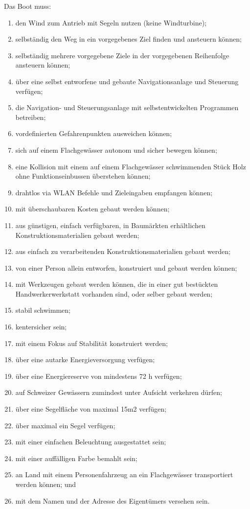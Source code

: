 Das Boot muss: 
\begin{enumerate}
    \item den Wind zum Antrieb mit Segeln nutzen (keine Windturbine);
    \item selbständig den Weg in ein vorgegebenes  Ziel finden und ansteuern können;
    \item selbständig mehrere vorgegebene Ziele in der vorgegebenen Reihenfolge ansteuern können;
    \item über eine selbst entworfene und gebaute Navigationsanlage und Steuerung verfügen;
    \item die Navigation- und Steuerungsanlage mit selbstentwickelten Programmen betreiben; 
    \item vordefinierten Gefahrenpunkten ausweichen können;
    \item sich auf einem Flachgewässer autonom und sicher bewegen können;
    \item eine Kollision mit einem auf einem Flachgewässer schwimmenden Stück Holz ohne Funktionseinbussen überstehen können;
    \item drahtlos via WLAN Befehle und Zieleingaben empfangen können;
    \item mit überschaubaren Kosten gebaut werden können;
    \item aus günstigen, einfach verfügbaren, in Baumärkten erhältlichen Konstruktionsmaterialien gebaut werden;
    \item aus einfach zu verarbeitenden Konstruktionsmaterialien gebaut werden;
    \item von einer Person allein entworfen, konstruiert und gebaut werden können;
    \item mit Werkzeugen gebaut werden können, die in einer gut bestückten Handwerkerwerkstatt vorhanden sind, oder selber gebaut werden; 
    \item stabil schwimmen;
    \item kentersicher sein;
    \item mit einem Fokus auf Stabilität konstruiert werden;
    \item über eine autarke Energieversorgung verfügen;
    \item über eine Energiereserve von mindestens 72 h verfügen;
    \item auf Schweizer Gewässern zumindest unter Aufsicht verkehren dürfen;
    \item über eine Segelfläche von maximal 15m2 verfügen;
    \item über maximal ein Segel verfügen;
    \item mit einer einfachen Beleuchtung ausgestattet sein;
    \item mit einer auffälligen Farbe bemahlt sein;
    \item an Land mit einem Personenfahrzeug an ein Flachgewässer transportiert werden können; und
    \item     mit dem Namen und der Adresse des Eigentümers versehen sein.
    \end{enumerate}

